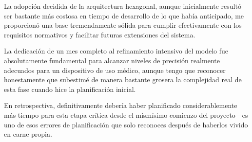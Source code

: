 La adopción decidida de la arquitectura hexagonal, aunque inicialmente resultó ser bastante más costosa en tiempo de desarrollo de lo que había anticipado, me proporcionó una base tremendamente sólida para cumplir efectivamente con los requisitos normativos y facilitar futuras extensiones del sistema. 

La dedicación de un mes completo al refinamiento intensivo del modelo fue absolutamente fundamental para alcanzar niveles de precisión realmente adecuados para un dispositivo de uso médico, aunque tengo que reconocer honestamente que subestimé de manera bastante grosera la complejidad real de esta fase cuando hice la planificación inicial. 

En retrospectiva, definitivamente debería haber planificado considerablemente más tiempo para esta etapa crítica desde el mismísimo comienzo del proyecto—es uno de esos errores de planificación que solo reconoces después de haberlos vivido en carne propia.